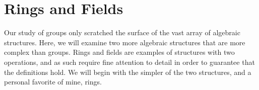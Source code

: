 \chapter{Rings and Fields}

Our study of groups only scratched the surface of the vast array of algebraic structures.
Here, we will examine two more algebraic structures that are more complex than groups.
Rings and fields are examples of structures with two operations, and as such require fine attention to detail in order to guarantee that the definitions hold.
We will begin with the simpler of the two structures, and a personal favorite of mine, rings.


